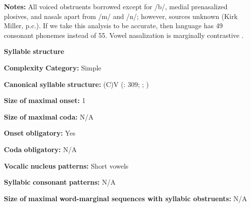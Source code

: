 \documentclass[output=paper]{langsci/langscibook}
\begin{document}
\begin{styleBody}
\textbf{Notes:} All voiced obstruents borrowed except for /b/, medial prenasalized plosives, and nasals apart from /m/ and /n/; however, sources unknown (Kirk Miller, p.c.). If we take this analysis to be accurate, then language has 49 consonant phonemes instead of 55. Vowel nasalization is marginally contrastive \citep[38]{Sands2013}.
\end{styleBody}

\begin{styleBody}
\textbf{Syllable} \textbf{structure}
\end{styleBody}

\begin{styleBody}
\textbf{Complexity} \textbf{Category:} Simple
\end{styleBody}

\begin{styleBody}
\textbf{Canonical} \textbf{syllable} \textbf{structure:} (C)V (\citealt{TuckerEtAl1977}: 309; \citealt{SandsEtAl1996}; \citealt{Sands2013})
\end{styleBody}

\begin{styleBody}
\textbf{Size} \textbf{of} \textbf{maximal} \textbf{onset:} 1
\end{styleBody}

\begin{styleBody}
\textbf{Size} \textbf{of} \textbf{maximal} \textbf{coda:} N/A
\end{styleBody}

\begin{styleBody}
\textbf{Onset} \textbf{obligatory:} Yes
\end{styleBody}

\begin{styleBody}
\textbf{Coda} \textbf{obligatory:} N/A
\end{styleBody}

\begin{styleBody}
\textbf{Vocalic} \textbf{nucleus} \textbf{patterns:} Short vowels
\end{styleBody}

\begin{styleBody}
\textbf{Syllabic} \textbf{consonant} \textbf{patterns:} N/A
\end{styleBody}

\begin{styleBody}
\textbf{Size} \textbf{of} \textbf{maximal} \textbf{word{}-marginal sequences with syllabic obstruents:} N/A
\end{styleBody}
\end{document}
